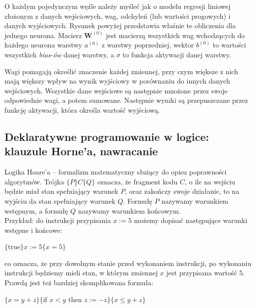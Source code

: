\documentclass[a4paper,12pt,oneside]{book}
\begin{document}
O każdym pojedynczym węźle należy myśleć jak o modelu regresji liniowej złożonym z danych wejściowych, wag, odchyleń (lub wartości progowych) i danych wyjściowych. Rysunek powyżej przedstawia właśnie te obliczenia dla jednego neurona. Macierz $\mathbf{W}^{(0)}$ jest macierzą wszystkich wag wchodzących do każdego neurona warstwy $a^{(0)}$ z warstwy poprzedniej, wektor $b^(0)$ to wartości wszystkich \textit{bias-ów} danej warstwy, a $\sigma$ to funkcja aktywacji danej warstwy.

Wagi pomagają określić znaczenie każdej zmiennej, przy czym większe z nich mają większy wpływ na wynik wyjściowy w porównaniu do innych danych wejściowych. Wszystkie dane wejściowe są następnie mnożone przez swoje odpowiednie wagi, a potem sumowane. Następnie wyniki są przepuszczane przez funkcję aktywacji, która określa wartość wyjściową.
	
\setcounter{subsection}{52}
\subsection{Deklaratywne programowanie w logice: klauzule Horne'a, nawracanie}
	Logika Hoare’a – formalizm matematyczny służący do opisu poprawności algorytmów.
	Trójka $\{P\}C\{Q\}$ oznacza, że fragment kodu $C$, o ile na wejściu będzie miał stan spełniający warunek $P$, oraz zakończy swoje działanie, to na wyjściu da stan spełniający warunek $Q$. Formułę $P$ nazywamy warunkiem wstępnym, a formułę $Q$ nazywamy warunkiem końcowym.\\
	
	Przykład:
	do instrukcji przypisania $x:=5$ możemy dopisać następujące warunki wstępne i końcowe:
		\begin{center}
				$\{{\text{true}}\}x:=5\{x=5\}$
		\end{center}
	co oznacza, że przy dowolnym stanie przed wykonaniem instrukcji, po wykonaniu instrukcji będziemy mieli stan, w którym zmiennej $x$ jest przypisana wartość 5.\\
	
	
	Prawdą jest też bardziej skomplikowana formuła:\\
	
	\begin{center}
		$\{x=y+z\}\{$if $x<y$ then $ z:=-z\}\{x\leq y+z\}$
	\end{center}
	
	
	
\end{document}
